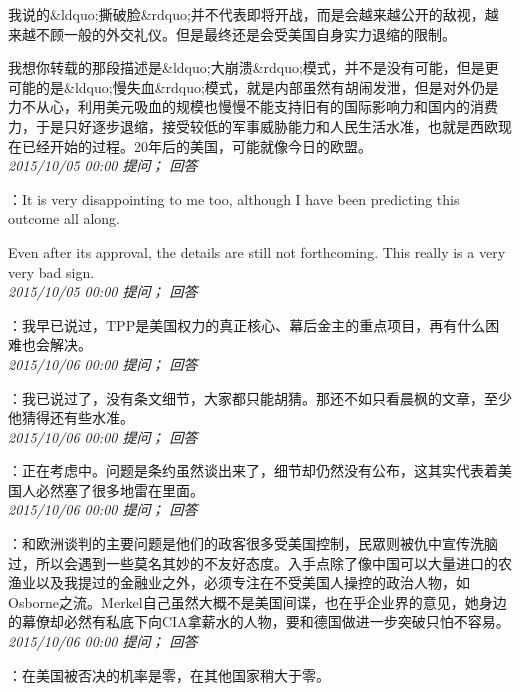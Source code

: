 \documentclass[twocolumn]{ctexart}
\begin{document}
我说的\&ldquo;撕破脸\&rdquo;并不代表即将开战，而是会越来越公开的敌视，越来越不顾一般的外交礼仪。但是最终还是会受美国自身实力退缩的限制。

我想你转载的那段描述是\&ldquo;大崩溃\&rdquo;模式，并不是没有可能，但是更可能的是\&ldquo;慢失血\&rdquo;模式，就是内部虽然有胡闹发泄，但是对外仍是力不从心，利用美元吸血的规模也慢慢不能支持旧有的国际影响力和国内的消费力，于是只好逐步退缩，接受较低的军事威胁能力和人民生活水准，也就是西欧现在已经开始的过程。20年后的美国，可能就像今日的欧盟。\\

\textit{\hfill\noindent\small 2015/10/05 00:00 提问； 回答}

：It is very disappointing to me too, although I have been predicting this outcome all along.

Even after its approval, the details are still not forthcoming. This really is a very very bad sign.\\

\textit{\hfill\noindent\small 2015/10/05 00:00 提问； 回答}

：我早已说过，TPP是美国权力的真正核心、幕后金主的重点项目，再有什么困难也会解决。\\

\textit{\hfill\noindent\small 2015/10/06 00:00 提问； 回答}

：我已说过了，没有条文细节，大家都只能胡猜。那还不如只看晨枫的文章，至少他猜得还有些水准。\\

\textit{\hfill\noindent\small 2015/10/06 00:00 提问； 回答}

：正在考虑中。问题是条约虽然谈出来了，细节却仍然没有公布，这其实代表着美国人必然塞了很多地雷在里面。\\

\textit{\hfill\noindent\small 2015/10/06 00:00 提问； 回答}

：和欧洲谈判的主要问题是他们的政客很多受美国控制，民眾则被仇中宣传洗脑过，所以会遇到一些莫名其妙的不友好态度。入手点除了像中国可以大量进口的农渔业以及我提过的金融业之外，必须专注在不受美国人操控的政治人物，如Osborne之流。Merkel自己虽然大概不是美国间谍，也在乎企业界的意见，她身边的幕僚却必然有私底下向CIA拿薪水的人物，要和德国做进一步突破只怕不容易。\\

\textit{\hfill\noindent\small 2015/10/06 00:00 提问； 回答}

：在美国被否决的机率是零，在其他国家稍大于零。
\end{document}
